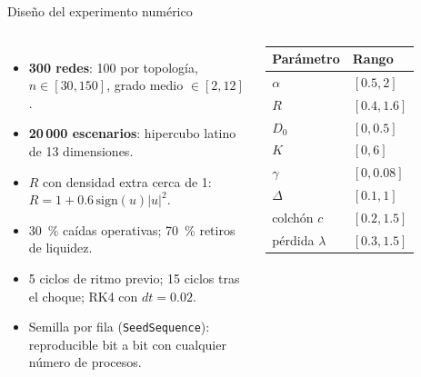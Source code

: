 \documentclass[aspectratio=169,10pt]{beamer}
\begin{document}
\begin{frame}{Diseño del experimento numérico}
\begin{columns}[T]
\begin{itemize}
\item \textbf{300 redes}: 100 por topología, $n\in[30,150]$, grado medio $\in[2,12]$.
\item \textbf{20\,000 escenarios}: hipercubo latino de 13 dimensiones.
\item $R$ con densidad extra cerca de 1: $R=1+0.6\,\mathrm{sign}(u)|u|^2$.
\item 30~\% caídas operativas; 70~\% retiros de liquidez.
\item 5 ciclos de ritmo previo; 15 ciclos tras el choque; RK4 con $dt=0.02$.
\item Semilla por fila (\texttt{SeedSequence}): reproducible bit a bit con cualquier
número de procesos.
\end{itemize}
\footnotesize
\begin{tabular}{ll}
\toprule
Parámetro & Rango \\
\midrule
$\alpha$ & $[0.5,2]$ \\
$R$ & $[0.4,1.6]$ \\
$D_0$ & $[0,0.5]$ \\
$K$ & $[0,6]$ \\
$\gamma$ & $[0,0.08]$ \\
$\Delta$ & $[0.1,1]$ \\
colchón $c$ & $[0.2,1.5]$ \\
pérdida $\lambda$ & $[0.3,1.5]$ \\
\bottomrule
\end{tabular}
\end{columns}
\end{frame}
\end{document}

